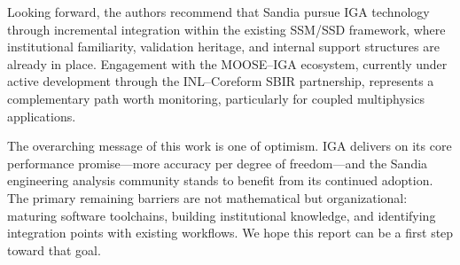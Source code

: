 \documentclass[12pt,report,justified]{SANDreport}
\begin{document}
Looking forward, the authors recommend that Sandia pursue IGA technology through
incremental integration within the existing SSM/SSD framework, where institutional
familiarity, validation heritage, and internal support structures are already in place.
Engagement with the MOOSE--IGA ecosystem, currently under active development through
the INL--Coreform SBIR partnership, represents a complementary path worth monitoring,
particularly for coupled multiphysics applications.

The overarching message of this work is one of optimism.  IGA delivers on its
core performance promise---more accuracy per degree of freedom---and the Sandia
engineering analysis community stands to benefit from its continued adoption.  
The primary remaining barriers are not mathematical but organizational: maturing software
toolchains, building institutional knowledge, and identifying integration points with
existing workflows.  We hope this report can be a first step toward that goal.



\end{document}
